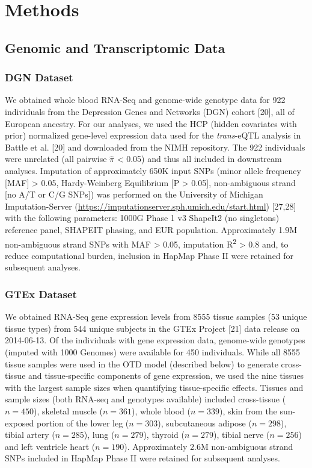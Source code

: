 \documentclass[]{article}
\begin{document}
\section{Methods}\label{methods}

\subsection{Genomic and Transcriptomic
Data}\label{genomic-and-transcriptomic-data}

\subsubsection{DGN Dataset}\label{dgn-dataset}

We obtained whole blood RNA-Seq and genome-wide genotype data for 922
individuals from the Depression Genes and Networks (DGN) cohort
{[}20{]}, all of European ancestry. For our analyses, we used the HCP
(hidden covariates with prior) normalized gene-level expression data
used for the \emph{trans}-eQTL analysis in Battle et al. {[}20{]} and
downloaded from the NIMH repository. The 922 individuals were unrelated
(all pairwise \(\hat{\pi}\) \textless{} 0.05) and thus all included in
downstream analyses. Imputation of approximately 650K input SNPs (minor
allele frequency {[}MAF{]} \textgreater{} 0.05, Hardy-Weinberg
Equilibrium {[}P \textgreater{} 0.05{]}, non-ambiguous strand {[}no A/T
or C/G SNPs{]}) was performed on the University of Michigan
Imputation-Server
(\url{https://imputationserver.sph.umich.edu/start.html}) {[}27,28{]}
with the following parameters: 1000G Phase 1 v3 ShapeIt2 (no singletons)
reference panel, SHAPEIT phasing, and EUR population. Approximately 1.9M
non-ambiguous strand SNPs with MAF \textgreater{} 0.05, imputation
R\textsuperscript{2} \textgreater{} 0.8 and, to reduce computational
burden, inclusion in HapMap Phase II were retained for subsequent
analyses.

\subsubsection{GTEx Dataset}\label{gtex-dataset}

We obtained RNA-Seq gene expression levels from 8555 tissue samples (53
unique tissue types) from 544 unique subjects in the GTEx Project
{[}21{]} data release on 2014-06-13. Of the individuals with gene
expression data, genome-wide genotypes (imputed with 1000 Genomes) were
available for 450 individuals. While all 8555 tissue samples were used
in the OTD model (described below) to generate cross-tissue and
tissue-specific components of gene expression, we used the nine tissues
with the largest sample sizes when quantifying tissue-specific effects.
Tissues and sample sizes (both RNA-seq and genotypes available) included
cross-tissue (\(n=450\)), skeletal muscle (\(n=361\)), whole blood
(\(n=339\)), skin from the sun-exposed portion of the lower leg
(\(n=303\)), subcutaneous adipose (\(n=298\)), tibial artery
(\(n=285\)), lung (\(n=279\)), thyroid (\(n=279\)), tibial nerve
(\(n=256\)) and left ventricle heart (\(n=190\)). Approximately 2.6M
non-ambiguous strand SNPs included in HapMap Phase II were retained for
subsequent analyses.
\end{document}
